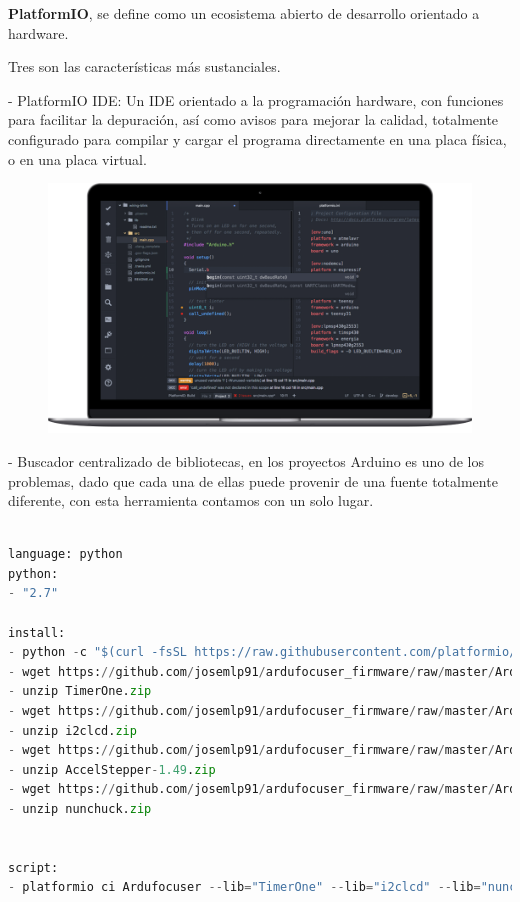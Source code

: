 \textbf{PlatformIO}, se define como un ecosistema abierto de desarrollo orientado a hardware. 

Tres son las características más sustanciales. 


- PlatformIO IDE: Un IDE orientado a la programación hardware, con funciones para facilitar la depuración, así como avisos para mejorar la calidad, totalmente configurado para compilar y cargar el programa directamente en una placa física, o en una placa virtual.


\begin{figure}
\centering
\includegraphics[width=0.7\linewidth]{../images/ide_arduino}
\caption{}
\label{fig:ide_arduino}
\end{figure}

- Buscador centralizado de bibliotecas, en los proyectos Arduino es uno de los problemas, dado que cada una de ellas puede provenir de una fuente totalmente diferente, con esta herramienta contamos con un solo lugar.

 
 
\newpage
\begin{lstlisting}[language=python, caption={Script travis para realizar integración continua},label={lst:write_read_serial_port_sample}]

language: python
python:
- "2.7"

install:
- python -c "$(curl -fsSL https://raw.githubusercontent.com/platformio/platformio/master/scripts/get-platformio.py)"
- wget https://github.com/josemlp91/ardufocuser_firmware/raw/master/Ardufocuser/libs/TimerOne.zip
- unzip TimerOne.zip
- wget https://github.com/josemlp91/ardufocuser_firmware/raw/master/Ardufocuser/libs/i2clcd.zip
- unzip i2clcd.zip
- wget https://github.com/josemlp91/ardufocuser_firmware/raw/master/Ardufocuser/libs/AccelStepper-1.49.zip
- unzip AccelStepper-1.49.zip
- wget https://github.com/josemlp91/ardufocuser_firmware/raw/master/Ardufocuser/libs/nunchuck.zip
- unzip nunchuck.zip


script:
- platformio ci Ardufocuser --lib="TimerOne" --lib="i2clcd" --lib="nunchuck" --lib="AccelStepper" --board=uno

\end{lstlisting}


